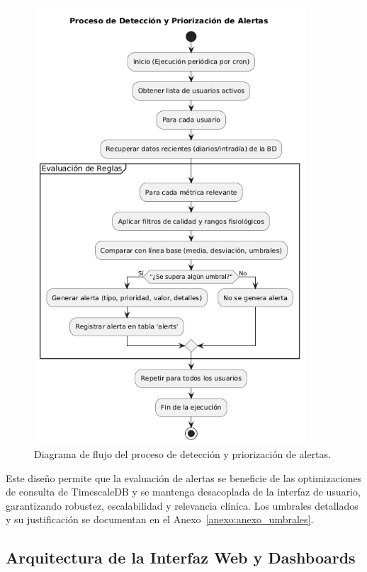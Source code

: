 \begin{figure}[htbp]
    \centering
    \includegraphics[width=0.9\textwidth,height=0.6\textheight]{imagenes/diagrama_alertas.png} 
    \caption{Diagrama de flujo del proceso de detección y priorización de alertas.}
    \label{fig:diagrama_alertas}
\end{figure}

Este diseño permite que la evaluación de alertas se beneficie de las optimizaciones de consulta de TimescaleDB y se mantenga desacoplada de la interfaz de usuario, garantizando robustez, escalabilidad y relevancia clínica.
Los umbrales detallados y su justificación se documentan en el Anexo~\ref{anexo:anexo_umbrales}.

\subsection{Arquitectura de la Interfaz Web y Dashboards}
\label{sec:arquitectura_dashboard}

